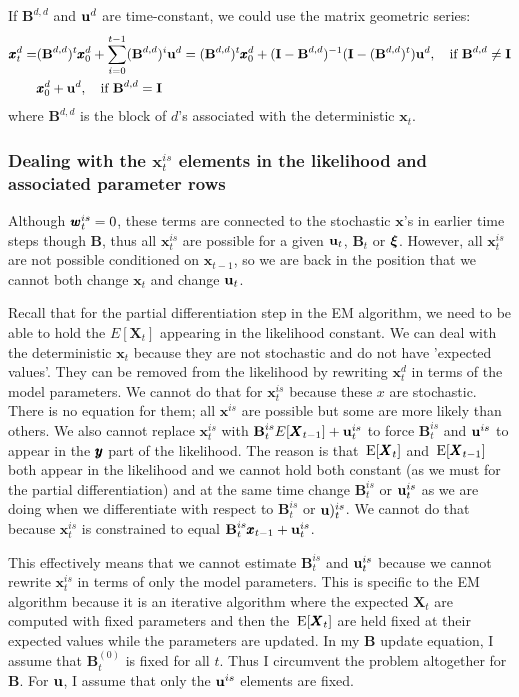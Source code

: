 \documentclass[]{article}
\def\xixi{\mbox{\boldmath $\xi$}}
\def\BB{\mbox{$\mathbf B$}}	\def\bb{\mbox{$\mathbf b$}}
\def\II{\mbox{$\mathbf I$}} \def\ii{\mbox{$\mathbf i$}}
\def\XX{\mbox{$\pmb{X}$}}	\def\xx{\mbox{$\pmb{x}$}}
\def\E{\,\textup{\textrm{E}}}
\begin{document}
If $\BB^{d,d}$ and $\mbox{$\mathbf u$}^d$ are time-constant, we could use the matrix geometric series: 
\begin{equation}\label{eq:xt.geo}
\begin{split}
\xx_t^{d}=&(\BB^{d,d})^t \xx_0^{d} + \sum_{i=0}^{t-1}(\BB^{d,d})^i \uu^{d} = 
(\BB^{d,d})^t \xx_0^{d} + (\II - \BB^{d,d})^{-1}(\II-(\BB^{d,d})^t)\uu^{d}, \quad\text{if }\BB^{d,d} \neq \II\\
&\xx_0^d + \uu^d,\quad\text{if }\BB^{d,d} = \II
\end{split}
\end{equation}
where $\BB^{d,d}$ is the block of $d$'s associated with the deterministic $\xx_t$. 

\subsubsection{Dealing with the $\xx_t^{is}$ elements in the likelihood and associated parameter rows}
Although $\mbox{$\pmb{w}$}_t^{is}=0$, these terms are connected to the stochastic $\xx$'s in earlier time steps though $\BB$, thus all $\xx_t^{is}$ are possible for a given $\mbox{$\mathbf u$}_t$, $\BB_t$ or $\xixi$. However, all $\xx_t^{is}$ are not possible conditioned on $\xx_{t-1}$, so we are back in the position that we cannot both change $\xx_t$ and change $\mbox{$\mathbf u$}_t$.

Recall that for the partial differentiation step in the EM algorithm, we need to be able to hold the $E[\XX_t]$ appearing in the likelihood constant.  We can deal with the deterministic $\xx_t$ because they are not stochastic and do not have 'expected values'.  They can be removed from the likelihood by rewriting $\xx_t^d$ in terms of the model parameters.  We cannot do that for $\xx_t^{is}$ because these $x$ are stochastic. There is no equation for them; all $\xx^{is}$ are possible but some are more likely than others.  We also cannot replace $\xx_t^{is}$ with $\BB_t^{is}E[\XX_{t-1}]+\uu_t^{is}$ to force $\BB_t^{is}$ and $\mbox{$\mathbf u$}^{is}$ to appear in the $\mbox{$\pmb{y}$}$ part of the likelihood.  The reason is that $\E[\XX_t]$ and $\E[\XX_{t-1}]$ both appear in the likelihood and we cannot hold both constant (as we must for the partial differentiation) and at the same time change $\BB_t^{is}$ or $\mbox{$\mathbf u$}_t^{is}$ as we are doing when we differentiate with respect to $\BB_t^{is}$ or $\mbox{$\mathbf u$})_t^{is}$.  We cannot do that because  $\xx_t^{is}$ is constrained to equal $\BB_t^{is}\xx_{t-1}+\uu_t^{is}$.

This effectively means that we cannot estimate $\BB_t^{is}$ and $\mbox{$\mathbf u$}_t^{is}$ because we cannot rewrite $\xx_t^{is}$ in terms of only the model parameters.  This is specific to the EM algorithm because it is an iterative algorithm where the expected $\XX_t$ are computed with fixed parameters and then the $\E[\XX_t]$ are held fixed at their expected values while the parameters are updated.  In my $\BB$ update equation, I assume that $\BB_t^{(0)}$ is fixed for all $t$.  Thus I circumvent the problem altogether for $\BB$.  For $\mbox{$\mathbf u$}$, I assume that only the $\mbox{$\mathbf u$}^{is}$ elements are fixed.
\end{document}
